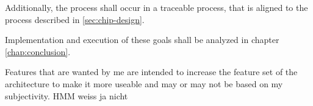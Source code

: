 Additionally, the process shall occur in a traceable process, that is aligned to the process described in \ref{sec:chip-design}.

Implementation and execution of these goals shall be analyzed in chapter \ref{chap:conclusion}.

Features that are wanted by me are intended to increase the feature set of the architecture to make it more useable and may or may not be based on my subjectivity. HMM weiss ja nicht